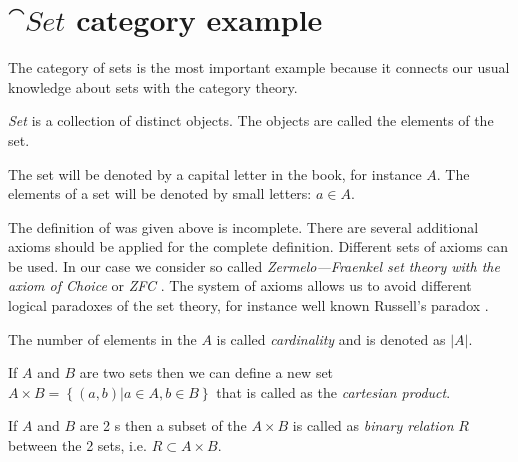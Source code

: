 \section{$\cat{Set}$ category example}
\label{sec:setcategory_example}
The category of sets is the most important example because it
connects our usual knowledge about sets with the category theory. 

\begin{definition}[Set]
  \label{def:set}
  \textit{Set} is a collection of distinct objects. The objects are called
  the elements of the set. 

  The set will be denoted by a capital letter in
  the book, for instance $A$. The elements of a set will be denoted by
  small letters: $a \in A$.
\end{definition}

\begin{remark}[Set]
  \label{rem:set}
  The definition of  was given
  above is incomplete. There are several additional axioms should be
  applied for the complete definition. Different sets of axioms can be
  used. In our case we consider so called \textit{Zermelo—Fraenkel set theory
  with the axiom of Choice} or \textit{ZFC} \cite{wiki:zfc}. The
  system of axioms allows us to avoid different logical paradoxes of
  the set theory, for instance well known Russell's
  paradox \cite{wiki:russell_paradox}.
\end{remark}

\begin{definition}[Cardinality]
\label{def:cardinality}
The number of elements in the  $A$ is called
\textit{cardinality} and is denoted as $\left|A\right|$.
\end{definition}

\begin{definition}
  \label{def:cartesian_product}
  If $A$ and $B$ are two sets then we can define a new set $A \times B
  = \left\{(a,b)|a \in A, b \in B\right\}$ that is called as the
  \textit{cartesian product}.
\end{definition}

\begin{definition}
  \label{def:binary_relation}
  If $A$ and $B$ are 2 s then a subset of the
   $A \times B$ is
  called as \textit{binary relation} $R$ between the 2 sets, i.e. $R
  \subset A \times B$.
\end{definition}

